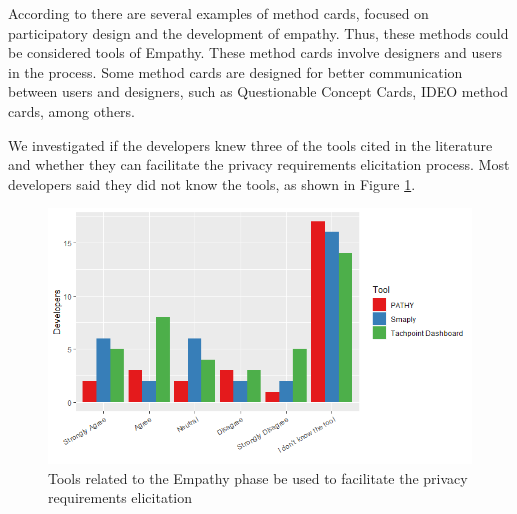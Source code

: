 \documentclass[conference]{IEEEtran}
\begin{document}
According to \cite{DBLP:conf/interact/WolfelM13} there are several examples of method cards, focused on participatory design and the development of empathy. Thus, these methods could be considered tools of Empathy. These method cards involve designers and users in the process. Some method cards are designed for better communication between users and designers, such as Questionable Concept Cards, IDEO method cards, among others.


We investigated if the developers knew three of the tools cited in the literature and whether they can facilitate the privacy requirements elicitation process. Most developers said they did not know the tools, as shown in Figure \ref{fig:tool}.

\begin{figure}
    \centering
    \includegraphics[width=5.5in]{Figures/RQ18.png}
    \caption{Tools related to the Empathy phase be used to facilitate the privacy requirements elicitation}
    \label{fig:tool}
\end{figure}

\end{document}
